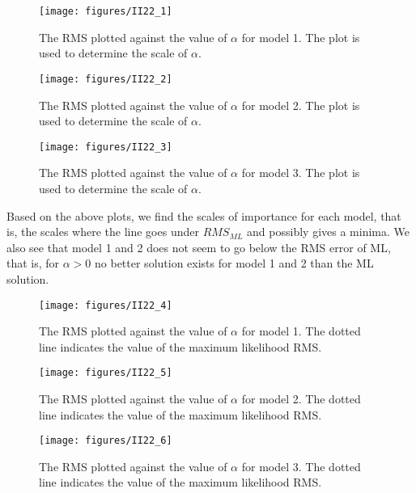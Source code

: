 \documentclass[a4paper, 11pt]{article}
\begin{document}
\begin{figure}[H]
    \centering
    \texttt{[image: figures/II22\_1]}
    \caption{The RMS plotted against the value of $\alpha$ for model 1. The plot is used to determine the scale of $\alpha$.}
    \label{fig:II22_1}
\end{figure}

\begin{figure}[H]
    \centering
    \texttt{[image: figures/II22\_2]}
    \caption{The RMS plotted against the value of $\alpha$ for model 2. The plot is used to determine the scale of $\alpha$.}
    \label{fig:II22_2}
\end{figure}

\begin{figure}[H]
    \centering
    \texttt{[image: figures/II22\_3]}
    \caption{The RMS plotted against the value of $\alpha$ for model 3. The plot is used to determine the scale of $\alpha$.}
    \label{fig:II22_3}
\end{figure}

Based on the above plots, we find the scales of importance for each model, that is, the scales where the line goes under $RMS_{ML}$ and possibly gives a minima. We also see that model 1 and 2 does not seem to go below the RMS error of ML, that is, for $\alpha > 0$ no better solution exists for model 1 and 2 than the ML solution.

\begin{figure}[H]
    \centering
    \texttt{[image: figures/II22\_4]}
    \caption{The RMS plotted against the value of $\alpha$ for model 1. The dotted line indicates the value of the maximum likelihood RMS.}
    \label{fig:II22_4}
\end{figure}

\begin{figure}[H]
    \centering
    \texttt{[image: figures/II22\_5]}
    \caption{The RMS plotted against the value of $\alpha$ for model 2. The dotted line indicates the value of the maximum likelihood RMS.}
    \label{fig:II22_5}
\end{figure}

\begin{figure}[H]
    \centering
    \texttt{[image: figures/II22\_6]}
    \caption{The RMS plotted against the value of $\alpha$ for model 3. The dotted line indicates the value of the maximum likelihood RMS.}
    \label{fig:II22_6}
\end{figure}
\end{document}

